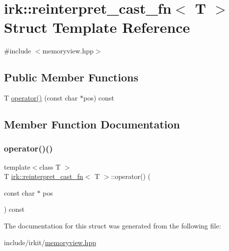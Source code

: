 \hypertarget{structirk_1_1reinterpret__cast__fn}{}\section{irk\+:\+:reinterpret\+\_\+cast\+\_\+fn$<$ T $>$ Struct Template Reference}
\label{structirk_1_1reinterpret__cast__fn}


{\ttfamily \#include $<$memoryview.\+hpp$>$}

\subsection*{Public Member Functions}
\begin{DoxyCompactItemize}
\item 
T \mbox{\hyperlink{structirk_1_1reinterpret__cast__fn_a52b9dc0045937a8e52cfc66ee834d54c}{operator()}} (const char $\ast$pos) const
\end{DoxyCompactItemize}


\subsection{Member Function Documentation}
\mbox{\label{structirk_1_1reinterpret__cast__fn_a52b9dc0045937a8e52cfc66ee834d54c}} 
\subsubsection{\texorpdfstring{operator()()}{operator()()}}
{\footnotesize\ttfamily template$<$class T $>$ \\
T \mbox{\hyperlink{structirk_1_1reinterpret__cast__fn}{irk\+::reinterpret\+\_\+cast\+\_\+fn}}$<$ T $>$\+::operator() (\begin{DoxyParamCaption}\item[{const char $\ast$}]{pos }\end{DoxyParamCaption}) const\hspace{0.3cm}{\ttfamily [inline]}}



The documentation for this struct was generated from the following file\+:\begin{DoxyCompactItemize}
\item 
include/irkit/\mbox{\hyperlink{memoryview_8hpp}{memoryview.\+hpp}}\end{DoxyCompactItemize}
